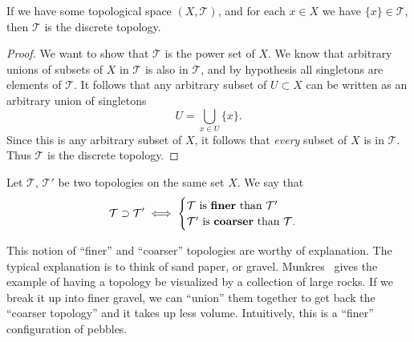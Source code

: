 \begin{prop}\label{prop:discreteTopologyFromSingletons}
  If we have some topological space $(X,\mathcal{T})$, and for
  each $x\in X$ we have $\{x\}\in\mathcal{T}$, then $\mathcal{T}$
  is the discrete topology.
\end{prop}
\begin{proof}
We want to show that $\mathcal{T}$ is the power set of $X$. We
know that arbitrary unions of subsets of $X$ in $\mathcal{T}$ is
also in $\mathcal{T}$, and by hypothesis all singletons are
elements of $\mathcal{T}$. It follows that any arbitrary subset
of $U\subset X$ can be written as an arbitrary union of
singletons
\begin{equation}
U = \bigcup_{x\in U} \{x\}.
\end{equation}
Since this is any arbitrary subset of $X$, it follows that
\emph{every} subset of $X$ is in $\mathcal{T}$. Thus
$\mathcal{T}$ is the discrete topology.
\end{proof}

\begin{defn}\label{defn:comparisonTopologies}
  Let $\mathcal{T}$, $\mathcal{T}'$ be two topologies on the same
  set $X$. We say that
\begin{equation}
\mathcal{T}\supset\mathcal{T}'\iff\begin{cases}
\mathcal{T}\text{ is \define{finer} than }\mathcal{T}'\\
\mathcal{T}'\text{ is \define{coarser} than }\mathcal{T}.
\end{cases}
\end{equation}
\end{defn}
\begin{rmk}
This notion of ``finer'' and ``coarser'' topologies are worthy of
explanation. The typical explanation is to think of sand paper,
or gravel. Munkres~\cite{munkres} gives the example of having a
topology be visualized by a collection of large rocks. If we
break it up into finer gravel, we can ``union'' them together to
get back the ``coarser topology'' and it takes up less
volume. Intuitively, this is a ``finer'' configuration of
pebbles. 
\end{rmk}
